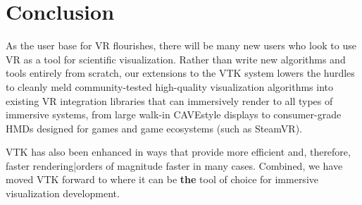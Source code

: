 \section{Conclusion}

As the user base for VR flourishes, there will be many
new users who look to use VR as a tool for scientific visualization.
Rather than write new algorithms and tools entirely from scratch,
our extensions to the VTK system lowers the hurdles to cleanly
meld community-tested high-quality visualization algorithms into
existing VR integration libraries that can immersively render to
all types of immersive systems, from large walk-in CAVE\texttrademark style displays
to consumer-grade HMDs designed for games and game ecosystems (such
as SteamVR).

VTK has also been enhanced in ways that provide more efficient and,
therefore, faster rendering|orders of magnitude faster in many cases.
Combined, we have moved VTK forward to where it can be \textbf{the}
tool of choice for immersive visualization development.

